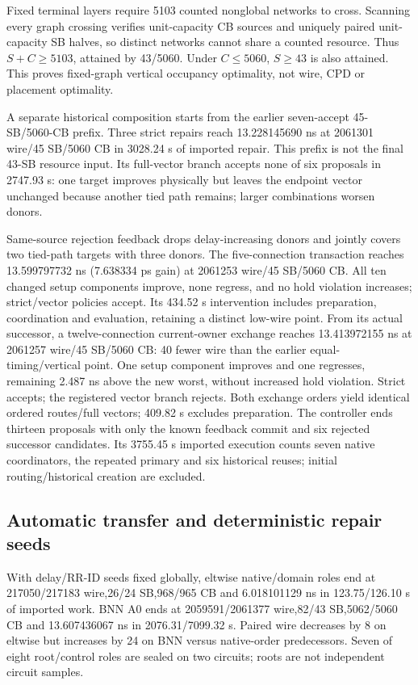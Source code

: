 \documentclass[conference,10pt]{IEEEtran}
\begin{document}
Fixed terminal layers require 5103 counted nonglobal networks to cross. Scanning every graph crossing verifies unit-capacity CB sources and uniquely paired unit-capacity SB halves, so distinct networks cannot share a counted resource. Thus $S+C\ge5103$, attained by 43/5060. Under $C\le5060$, $S\ge43$ is also attained. This proves fixed-graph vertical occupancy optimality, not wire, CPD or placement optimality.

A separate historical composition starts from the earlier seven-accept 45-SB/5060-CB prefix. Three strict repairs reach 13.228145690 ns at 2061301 wire/45 SB/5060 CB in 3028.24 s of imported repair. This prefix is not the final 43-SB resource input. Its full-vector branch accepts none of six proposals in 2747.93 s: one target improves physically but leaves the endpoint vector unchanged because another tied path remains; larger combinations worsen donors.

Same-source rejection feedback drops delay-increasing donors and jointly covers two tied-path targets with three donors. The five-connection transaction reaches 13.599797732 ns (7.638334 ps gain) at 2061253 wire/45 SB/5060 CB. All ten changed setup components improve, none regress, and no hold violation increases; strict/vector policies accept. Its 434.52 s intervention includes preparation, coordination and evaluation, retaining a distinct low-wire point. From its actual successor, a twelve-connection current-owner exchange reaches 13.413972155 ns at 2061257 wire/45 SB/5060 CB: 40 fewer wire than the earlier equal-timing/vertical point. One setup component improves and one regresses, remaining 2.487 ns above the new worst, without increased hold violation. Strict accepts; the registered vector branch rejects. Both exchange orders yield identical ordered routes/full vectors; 409.82 s excludes preparation. The controller ends thirteen proposals with only the known feedback commit and six rejected successor candidates. Its 3755.45 s imported execution counts seven native coordinators, the repeated primary and six historical reuses; initial routing/historical creation are excluded.

\subsection{Automatic transfer and deterministic repair seeds}
With delay/RR-ID seeds fixed globally, eltwise native/domain roles end at 217050/217183 wire,26/24 SB,968/965 CB and 6.018101129 ns in 123.75/126.10 s of imported work. BNN A0 ends at 2059591/2061377 wire,82/43 SB,5062/5060 CB and 13.607436067 ns in 2076.31/7099.32 s. Paired wire decreases by 8 on eltwise but increases by 24 on BNN versus native-order predecessors. Seven of eight root/control roles are sealed on two circuits; roots are not independent circuit samples.
\end{document}
